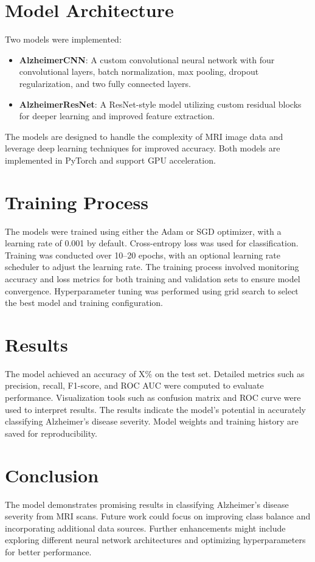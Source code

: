 \documentclass{article}
\begin{document}
\section{Model Architecture}
Two models were implemented:
\begin{itemize}
    \item \textbf{AlzheimerCNN}: A custom convolutional neural network with four convolutional layers, batch normalization, max pooling, dropout regularization, and two fully connected layers.
    \item \textbf{AlzheimerResNet}: A ResNet-style model utilizing custom residual blocks for deeper learning and improved feature extraction.
\end{itemize}
The models are designed to handle the complexity of MRI image data and leverage deep learning techniques for improved accuracy. Both models are implemented in PyTorch and support GPU acceleration.

\section{Training Process}
The models were trained using either the Adam or SGD optimizer, with a learning rate of 0.001 by default. Cross-entropy loss was used for classification. Training was conducted over 10--20 epochs, with an optional learning rate scheduler to adjust the learning rate. The training process involved monitoring accuracy and loss metrics for both training and validation sets to ensure model convergence. Hyperparameter tuning was performed using grid search to select the best model and training configuration.

\section{Results}
The model achieved an accuracy of X\% on the test set. Detailed metrics such as precision, recall, F1-score, and ROC AUC were computed to evaluate performance. Visualization tools such as confusion matrix and ROC curve were used to interpret results. The results indicate the model's potential in accurately classifying Alzheimer's disease severity. Model weights and training history are saved for reproducibility.

\section{Conclusion}
The model demonstrates promising results in classifying Alzheimer's disease severity from MRI scans. Future work could focus on improving class balance and incorporating additional data sources. Further enhancements might include exploring different neural network architectures and optimizing hyperparameters for better performance.
\end{document}
